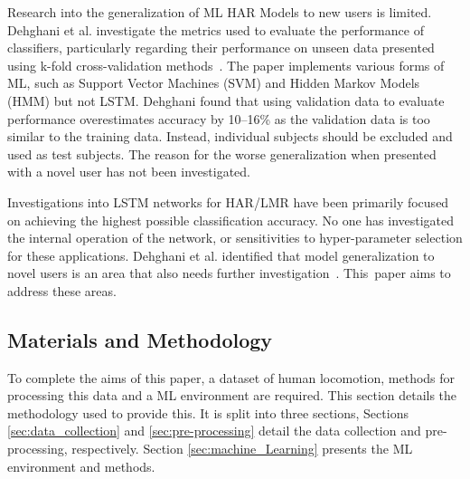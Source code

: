 Research into the generalization of ML HAR Models to new users is limited. Dehghani et al. investigate the metrics used to evaluate the performance of classifiers, particularly regarding their performance on unseen data presented using k-fold cross-validation methods~\cite{Dehghani2019}. The paper implements various forms of ML, such as Support Vector Machines (SVM) and Hidden Markov Models (HMM) but not LSTM. Dehghani found that using validation data to evaluate performance overestimates accuracy by 10--16\% as the validation data is too similar to the training data. Instead, individual subjects should be excluded and used as test subjects. The reason for the worse generalization when presented with a novel user has not been investigated.

Investigations into LSTM networks for HAR/LMR have been primarily focused on achieving the highest possible classification accuracy. No one has investigated the internal operation of the network, or sensitivities to hyper-parameter selection for these applications. Dehghani et al. identified that model generalization to novel users is an area that also needs further investigation~\cite{Dehghani2019}. This~paper aims to address these areas.

\subsection{Materials and Methodology}
\label{sec:materials_and_methdology}
To complete the aims of this paper, a dataset of human locomotion, methods for processing this data and a ML environment are required. This section details the methodology used to provide this. It is split into three sections, Sections \ref{sec:data_collection} and \ref{sec:pre-processing} detail the data collection and pre-processing, respectively. Section \ref{sec:machine_Learning} presents the ML environment and methods.

